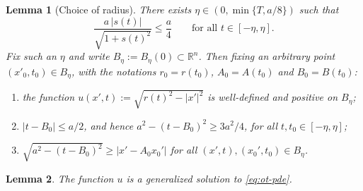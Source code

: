 \documentclass[10pt,a4paper]{amsart}
\newtheorem{lemma}{Lemma}
\newcommand{\R}{\mathbb{R}}
\begin{document}
\begin{lemma}[Choice of radius]\label{lem:radius}
    There exists $\eta\in(0,\min\{T,a/8\})$ such that
    \begin{equation}\label{eq:R-cond}
        \frac{a\,|s(t)|}{\sqrt{1+s(t)^2}}\leq\frac a4\qquad\text{for all }t\in[-\eta,\eta].
    \end{equation}
    Fix such an $\eta$ and write $B_\eta:=B_\eta(0)\subset\R^n$. Then fixing an arbitrary point $(x'_0,t_0)\in B_\eta$, with the notations
    $r_0=r(t_0)$, $A_0=A(t_0)$ and $B_0=B(t_0)$:
    \begin{enumerate}
        \item[\rm(i)] the function $u(x',t):=\sqrt{r(t)^2-|x'|^2}$ is well-defined and positive
        on $B_\eta$;
        \item[\rm(ii)] $|t-B_0|\leq a/2$, and hence $a^2-(t-B_0)^2\geq 3a^2/4$, for all
        $t,t_0\in[-\eta,\eta]$;
        \item[\rm(iii)] $\sqrt{a^2-(t-B_0)^2}\geq|x'-A_0x_0'|$ for all
        $(x',t),(x_0',t_0)\in B_\eta$.
    \end{enumerate}
\end{lemma}

\begin{lemma}\label{lem:gs}
    The function $u$ is a generalized solution to \eqref{eq:ot-pde}.
\end{lemma}
\end{document}
